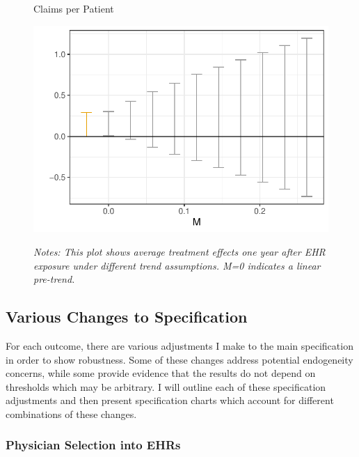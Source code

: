 \documentclass[12pt]{article}
\begin{document}
\begin{figure}[ht]
    \centering
    \captionsetup{width=.5\linewidth}
    \caption{Claims per Patient}
    \includegraphics[scale=.5]{Objects/claim_pretrends_plot.pdf}
    \label{fig:pre_claim}
    \vspace{2mm}
    \caption*{\footnotesize{\textit{Notes: This plot shows average treatment effects one year after EHR exposure under different trend assumptions. M=0 indicates a linear pre-trend.}}}
\end{figure}

\subsection{Various Changes to Specification}\label{sec:changes}

For each outcome, there are various adjustments I make to the main specification in order to show robustness. Some of these changes address potential endogeneity concerns, while some provide evidence that the results do not depend on thresholds which may be arbitrary. I will outline each of these specification adjustments and then present specification charts which account for different combinations of these changes. 

\subsubsection{Physician Selection into EHRs}\label{sec:endog}
\end{document}
